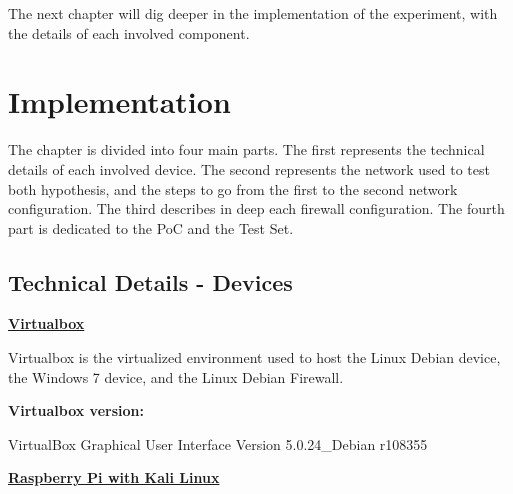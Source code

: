 \documentclass[12pt]{article}
\begin{document}
The next chapter will dig deeper in the implementation of the experiment, with the details of each involved component.




\pagebreak

\section{Implementation}
\label{sec:4}

The chapter is divided into four main parts. The first represents the technical details of each involved device. The second represents the network used to test both hypothesis, and the steps to go from the first to the second network configuration. The third describes in deep each firewall configuration. The fourth part is dedicated to the PoC and the Test Set.

\subsection{Technical Details - Devices}
\label{sub:technicalDetDev}

\textbf{\underline{Virtualbox}}

\vspace{-10pt}
Virtualbox is the virtualized environment used to host the Linux Debian device, the Windows 7 device, and the Linux Debian Firewall.

\textbf{Virtualbox version:} 

\vspace{-15pt}
VirtualBox Graphical User Interface Version 5.0.24_Debian r108355

\textbf{\underline{Raspberry Pi with Kali Linux}}


\begin{savenotes}
\begin{table}[!htpb]
\centering
\addtolength{\tabcolsep}{1pt}
\noindent{}
\caption{Raspberry Pi implementation}
\label{table:raspImpl}
\end{table}
\end{savenotes}
\end{document}
